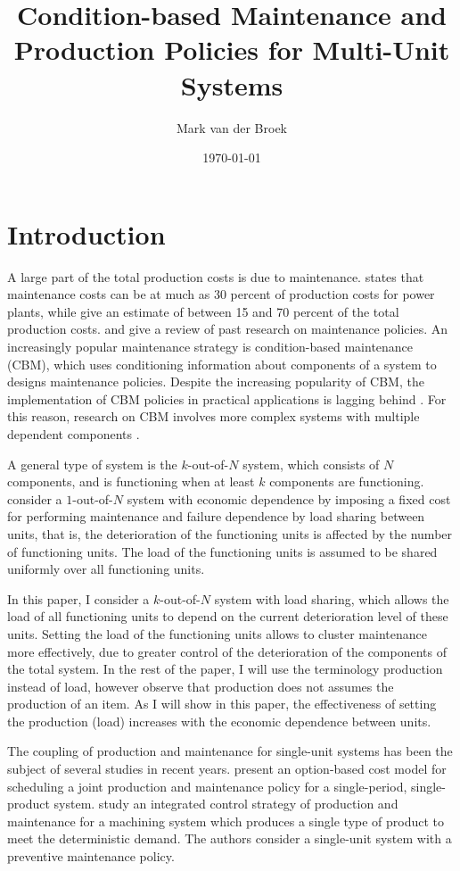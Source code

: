 \documentclass[a4paper,12pt]{article}
\title{Condition-based Maintenance and Production Policies for Multi-Unit Systems}
\author{Mark van der Broek}
\date{\today}
\begin{document}
	
	\maketitle

\section{Introduction}	
A large part of the total production costs is due to maintenance. \cite{GRABER2004861} states that maintenance costs can be at much as 30 percent of production costs for power plants, while \cite{BEVILACQUA200071} give an estimate of between 15 and 70 percent of the total production costs. \cite{wang2002survey} and \cite{ding2015maintenance} give a review of past research on maintenance policies. An increasingly popular maintenance strategy is condition-based maintenance (CBM), which uses conditioning information about components of a system to designs maintenance policies. Despite the increasing popularity of CBM, the implementation of CBM policies in practical applications is lagging behind \citep{keizer2017condition}. For this reason, research on CBM involves more complex systems with multiple dependent components \citep{}. 

A general type of system is the $k$-out-of-$N$ system, which consists of $N$ components, and is functioning when at least $k$ components are functioning. \cite{OLDEKEIZER2018319} consider a $1$-out-of-$N$ system with economic dependence by imposing a fixed cost for performing maintenance and failure dependence by load sharing between units, that is, the deterioration of the functioning units is affected by the number of functioning units. The load of the functioning units is assumed to be shared uniformly over all functioning units. 

In this paper, I consider a $k$-out-of-$N$ system with load sharing, which allows the load of all functioning units to depend on the current deterioration level of these units. Setting the load of the functioning units allows to cluster maintenance more effectively, due to greater control of the deterioration of the components of the total system. In the rest of the paper, I will use the terminology production instead of load, however observe that production does not assumes the production of an item. As I will show in this paper, the effectiveness of setting the production (load) increases with the economic dependence between units. 


The coupling of production and maintenance for single-unit systems has been the subject of several studies in recent years. \cite{doi:10.1080/00207543.2013.843037} present an option-based cost model for scheduling a joint production and maintenance policy for a single-period, single-product system. \cite{doi:10.1080/00207543.2016.1174343} study an integrated control strategy of production and maintenance for a machining system which produces a single type of product to meet the deterministic demand. The authors consider a single-unit system with a preventive maintenance policy. 
\end{document}
